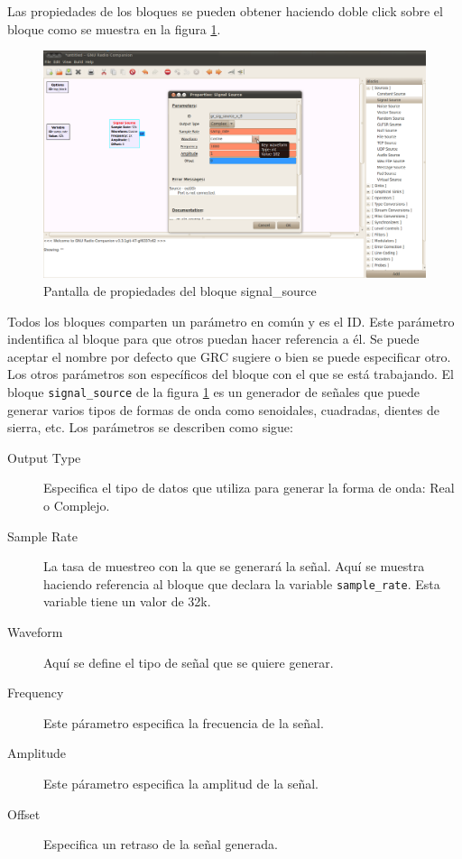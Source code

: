Las propiedades de los bloques se pueden obtener haciendo doble click sobre el bloque como se
muestra en la figura \ref{fig:blockprop}.

\begin{figure}[tp]
  \centering
  \includegraphics[width=5.5in]{figs/grc3}
  \vspace{0.1in}
  \caption{Pantalla de propiedades del bloque signal\_source}
  \label{fig:blockprop}
\end{figure}

Todos los bloques comparten un par\'ametro en com\'un y es el ID. Este par\'ametro indentifica al bloque
para que otros puedan hacer referencia a \'el. Se puede aceptar el nombre por defecto que GRC sugiere o
bien se puede especificar otro. Los otros par\'ametros son espec\'ificos del bloque con el que se est\'a
trabajando. El bloque \verb|signal_source| de la figura \ref{fig:blockprop} es un generador de
se\~nales que puede generar varios tipos de formas de onda como senoidales, cuadradas, dientes de
sierra, etc. Los par\'ametros se describen como sigue:

\begin{description}
\item[Output Type] Especifica el tipo de datos que utiliza para generar la forma de onda: Real o Complejo.
\item[Sample Rate] La tasa de muestreo con la que se generar\'a la se\~nal. Aqu\'i se muestra haciendo
referencia al bloque que declara la variable \verb|sample_rate|. Esta variable tiene un valor de
32k.
\item[Waveform] Aqu\'i se define el tipo de se\~nal que se quiere generar.
\item[Frequency] Este p\'arametro especifica la frecuencia de la se\~nal.
\item[Amplitude] Este p\'arametro especifica la amplitud de la se\~nal.
\item[Offset] Especifica un retraso de la se\~nal generada.
\end{description}


